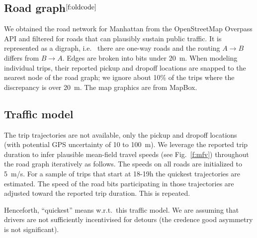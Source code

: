 \documentclass[12pt,notitlepage]{article}
\begin{document}
\subsection{Road graph${}^{\ref{f:oldcode}}$} 
\label{s:graph}



We obtained the road network for Manhattan
%
from the OpenStreetMap Overpass API
and filtered for roads that can plausibly sustain public traffic.
%
%
It is represented as a digraph,
i.e.~%
there are one-way roads 
and
the routing $A \to B$ differs from $B \to A$.
%
Edges are broken into bits under \SI{20}{m}.
%
%
When modeling individual trips,
their reported pickup and dropoff locations
are snapped to the nearest node of the road graph;
we ignore about 10\% of the trips 
where the discrepancy is over \SI{20}{m}.
%
%
%
%
The map graphics are from MapBox.



\subsection{Traffic model} \label{s:traffic}

The trip trajectories are not available,
only the pickup and dropoff locations
(with potential GPS uncertainty of 10 to \SI{100}{m}).
%
%
We leverage the reported trip duration to
infer plausible mean-field travel speeds
(see Fig.~\ref{f:mfv})
throughout the road graph
iteratively as follows.
%
The speeds on all roads are initialized to \SI{5}{m/s}.
%
For a sample of trips that start at 18-19h
the quickest trajectories are estimated.
%
The speed of the road bits participating in those trajectories
are adjusted toward the reported trip duration.
%
This is repeated.
%
%

%

Henceforth, ``quickest''
means
w.r.t.~this traffic model.
%
%
We are assuming that drivers
are not sufficiently incentivised for detours
(the credence good asymmetry is not significant).
\end{document}
